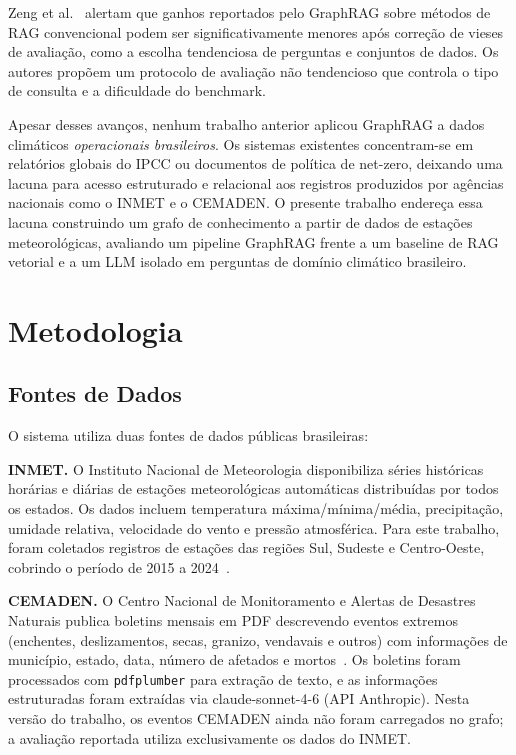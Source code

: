 \documentclass[conference]{IEEEtran}
\begin{document}
Zeng et al.~\cite{zeng2025unbiased} alertam que ganhos reportados
pelo GraphRAG sobre métodos de RAG convencional podem ser
significativamente menores após correção de vieses de avaliação,
como a escolha tendenciosa de perguntas e conjuntos de dados.
Os autores propõem um protocolo de avaliação não tendencioso que
controla o tipo de consulta e a dificuldade do benchmark.

Apesar desses avanços, nenhum trabalho anterior aplicou GraphRAG
a dados climáticos \emph{operacionais brasileiros}.
Os sistemas existentes concentram-se em relatórios globais do IPCC
ou documentos de política de net-zero, deixando uma lacuna para
acesso estruturado e relacional aos registros produzidos por agências
nacionais como o INMET e o CEMADEN.
O presente trabalho endereça essa lacuna construindo um grafo de
conhecimento a partir de dados de estações meteorológicas,
avaliando um pipeline GraphRAG frente a um baseline de RAG vetorial
e a um LLM isolado em perguntas de domínio climático brasileiro.

\section{Metodologia}
\label{sec:metodologia}

\subsection{Fontes de Dados}

O sistema utiliza duas fontes de dados públicas brasileiras:

\textbf{INMET.} O Instituto Nacional de Meteorologia disponibiliza
séries históricas horárias e diárias de estações meteorológicas
automáticas distribuídas por todos os estados.
Os dados incluem temperatura máxima/mínima/média, precipitação,
umidade relativa, velocidade do vento e pressão atmosférica.
Para este trabalho, foram coletados registros de estações das regiões
Sul, Sudeste e Centro-Oeste, cobrindo o período de 2015 a 2024~\cite{inmet2024dados}.

\textbf{CEMADEN.} O Centro Nacional de Monitoramento e Alertas
de Desastres Naturais publica boletins mensais em PDF descrevendo
eventos extremos (enchentes, deslizamentos, secas, granizo, vendavais
e outros) com informações de município, estado, data, número de
afetados e mortos~\cite{cemaden2024boletins}.
Os boletins foram processados com \texttt{pdfplumber} para extração
de texto, e as informações estruturadas foram extraídas via
claude-sonnet-4-6 (API Anthropic).
Nesta versão do trabalho, os eventos CEMADEN ainda não foram
carregados no grafo; a avaliação reportada utiliza exclusivamente
os dados do INMET.
\end{document}
